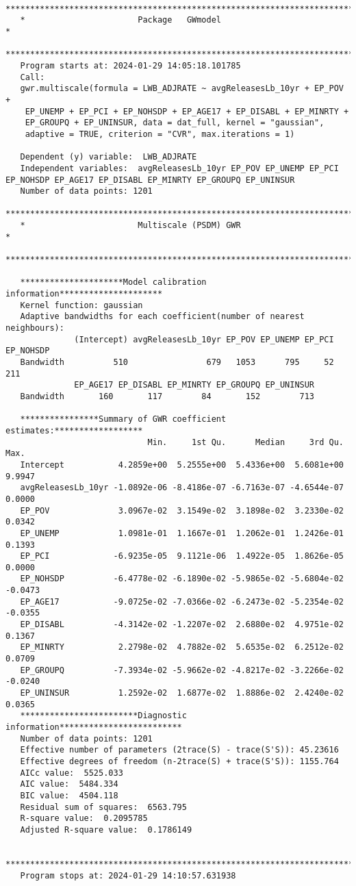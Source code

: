 \documentclass[
  12pt,
]{article}
\begin{document}
\begin{verbatim}
   ***********************************************************************
   *                       Package   GWmodel                             *
   ***********************************************************************
   Program starts at: 2024-01-29 14:05:18.101785 
   Call:
   gwr.multiscale(formula = LWB_ADJRATE ~ avgReleasesLb_10yr + EP_POV + 
    EP_UNEMP + EP_PCI + EP_NOHSDP + EP_AGE17 + EP_DISABL + EP_MINRTY + 
    EP_GROUPQ + EP_UNINSUR, data = dat_full, kernel = "gaussian", 
    adaptive = TRUE, criterion = "CVR", max.iterations = 1)

   Dependent (y) variable:  LWB_ADJRATE
   Independent variables:  avgReleasesLb_10yr EP_POV EP_UNEMP EP_PCI EP_NOHSDP EP_AGE17 EP_DISABL EP_MINRTY EP_GROUPQ EP_UNINSUR
   Number of data points: 1201
   ***********************************************************************
   *                       Multiscale (PSDM) GWR                          *
   ***********************************************************************

   *********************Model calibration information*********************
   Kernel function: gaussian 
   Adaptive bandwidths for each coefficient(number of nearest neighbours): 
              (Intercept) avgReleasesLb_10yr EP_POV EP_UNEMP EP_PCI EP_NOHSDP
   Bandwidth          510                679   1053      795     52       211
              EP_AGE17 EP_DISABL EP_MINRTY EP_GROUPQ EP_UNINSUR
   Bandwidth       160       117        84       152        713

   ****************Summary of GWR coefficient estimates:******************
                             Min.     1st Qu.      Median     3rd Qu.    Max.
   Intercept           4.2859e+00  5.2555e+00  5.4336e+00  5.6081e+00  9.9947
   avgReleasesLb_10yr -1.0892e-06 -8.4186e-07 -6.7163e-07 -4.6544e-07  0.0000
   EP_POV              3.0967e-02  3.1549e-02  3.1898e-02  3.2330e-02  0.0342
   EP_UNEMP            1.0981e-01  1.1667e-01  1.2062e-01  1.2426e-01  0.1393
   EP_PCI             -6.9235e-05  9.1121e-06  1.4922e-05  1.8626e-05  0.0000
   EP_NOHSDP          -6.4778e-02 -6.1890e-02 -5.9865e-02 -5.6804e-02 -0.0473
   EP_AGE17           -9.0725e-02 -7.0366e-02 -6.2473e-02 -5.2354e-02 -0.0355
   EP_DISABL          -4.3142e-02 -1.2207e-02  2.6880e-02  4.9751e-02  0.1367
   EP_MINRTY           2.2798e-02  4.7882e-02  5.6535e-02  6.2512e-02  0.0709
   EP_GROUPQ          -7.3934e-02 -5.9662e-02 -4.8217e-02 -3.2266e-02 -0.0240
   EP_UNINSUR          1.2592e-02  1.6877e-02  1.8886e-02  2.4240e-02  0.0365
   ************************Diagnostic information*************************
   Number of data points: 1201 
   Effective number of parameters (2trace(S) - trace(S'S)): 45.23616 
   Effective degrees of freedom (n-2trace(S) + trace(S'S)): 1155.764 
   AICc value:  5525.033 
   AIC value:  5484.334 
   BIC value:  4504.118 
   Residual sum of squares:  6563.795 
   R-square value:  0.2095785 
   Adjusted R-square value:  0.1786149 

   ***********************************************************************
   Program stops at: 2024-01-29 14:10:57.631938 
\end{verbatim}
\end{document}
